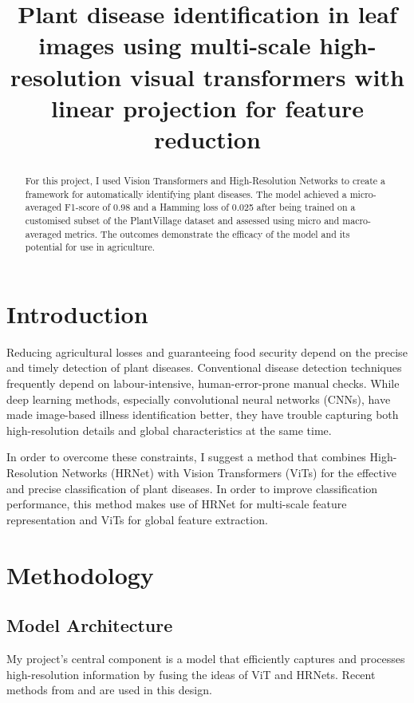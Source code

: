 \documentclass[conference]{IEEEtran}
\begin{document}
\title{Plant disease identification in leaf images using multi-scale high-resolution  visual transformers with linear projection for feature reduction}

\author{
}

\maketitle
\begin{abstract}
For this project, I used Vision Transformers and High-Resolution Networks to create a framework for automatically identifying plant diseases. The model achieved a micro-averaged F1-score of 0.98 and a Hamming loss of 0.025 after being trained on a customised subset of the PlantVillage dataset and assessed using micro and macro-averaged metrics. The outcomes demonstrate the efficacy of the model and its potential for use in agriculture.
\end{abstract}

\section{Introduction}
Reducing agricultural losses and guaranteeing food security depend on the precise and timely detection of plant diseases. Conventional disease detection techniques frequently depend on labour-intensive, human-error-prone manual checks. While deep learning methods, especially convolutional neural networks (CNNs), have made image-based illness identification better, they have trouble capturing both high-resolution details and global characteristics at the same time.

In order to overcome these constraints, I suggest a method that combines High-Resolution Networks (HRNet) with Vision Transformers (ViTs) for the effective and precise classification of plant diseases. In order to improve classification performance, this method makes use of HRNet for multi-scale feature representation and ViTs for global feature extraction.

\section{Methodology}
\subsection{Model Architecture}
My project's central component is a model that efficiently captures and processes high-resolution information by fusing the ideas of ViT and HRNets. Recent methods from \cite{wang2020} and \cite{gu2021} are used in this design.
\end{document}

